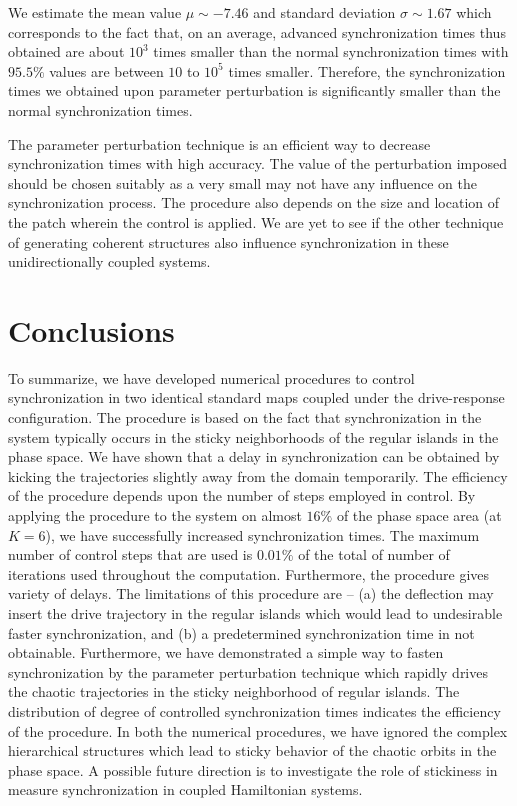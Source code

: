 \documentclass[reprint,amsmath,amssymb,aps,pre]{revtex4-1}
\begin{document}
We estimate the mean value $\mu \sim -7.46$ and standard deviation $\sigma 
\sim1.67$ which corresponds to the fact that, on an average, advanced 
synchronization times thus obtained are about $10^3$ times smaller than the 
normal synchronization times with $95.5\%$ values are between $10$ to $10^5$ 
times smaller.  Therefore, the synchronization times we obtained upon 
parameter perturbation is significantly smaller than the normal 
synchronization times.

The parameter perturbation technique is an efficient way to decrease synchronization times with high accuracy.  The value of the perturbation imposed should be chosen suitably as a very small may not have any influence on the synchronization process. The procedure also depends on the size and location of the patch wherein the control is applied. We are yet to see if the other technique of generating coherent structures also influence synchronization in these unidirectionally coupled systems. 


\section{Conclusions}
\label{sec:conclusions}
To summarize, we have developed numerical procedures to control 
synchronization in two identical standard maps coupled under the 
drive-response configuration. The procedure is based on the fact that 
synchronization in the system typically occurs in the sticky neighborhoods of the regular islands in 
the phase space. We have shown that a delay in synchronization can be obtained 
by kicking the trajectories slightly away from the domain temporarily. The 
efficiency of the procedure depends upon the number of steps employed in 
control. By applying the procedure to the system on almost $16\%$ of the phase 
space area (at $K = 6$), we have successfully increased synchronization times. 
The maximum number of control steps that are used is $0.01\%$ of the total of 
number of iterations used throughout the computation.  Furthermore, the 
procedure gives variety of delays. The limitations of this procedure are -- (a) the deflection may insert the drive trajectory in the regular islands which would lead to undesirable faster synchronization, and (b) a predetermined synchronization time in not obtainable. Furthermore, we have demonstrated a simple way to fasten synchronization by the parameter perturbation technique which rapidly drives the chaotic trajectories in the sticky neighborhood of regular islands. The distribution of degree of controlled synchronization times indicates the efficiency of the procedure. In both the numerical procedures, we have ignored the complex hierarchical structures which lead to sticky behavior of the chaotic orbits in the phase space. A possible future direction is to investigate the role of stickiness in measure synchronization in coupled Hamiltonian systems.
\end{document}
